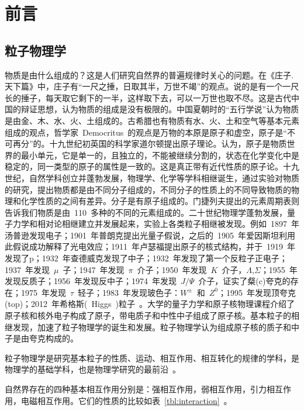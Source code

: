 \chapter{前言}

\section{粒子物理学}

物质是由什么组成的？这是人们研究自然界的普遍规律时关心的问题。在《庄子.天下篇》中，庄子有“一尺之捶，日取其半，万世不竭”的观点。说的是有一个一尺长的捶子，每天取它剩下的一半，这样取下去，可以一万世也取不尽。这是古代中国的辩证思想，认为物质的组成是没有极限的。中国夏朝时的“五行学说”认为物质是由金、木、水、火、土组成的。古希腊也有物质有水、火、土和空气等基本元素组成的观点，哲学家~Democritus~的观点是万物的本原是原子和虚空，原子是“不可再分”的。十九世纪初英国的科学家道尔顿提出原子理论。认为，原子是物质世界的最小单元，它是单一的，且独立的，不能被继续分割的，状态在化学变化中是稳定的，同一类型的原子的属性是一致的。这是真正带有近代性质的原子论。十九世纪，自然学科创立并蓬勃发展，物理学、化学等学科相继诞生，通过实验对物质的研究，提出物质都是由不同分子组成的，不同分子的性质上的不同导致物质的物理和化学性质的之间有差异。分子是有原子组成的。门捷列夫提出的元素周期表则告诉我们物质是由~110~多种的不同的元素组成的。二十世纪物理学蓬勃发展，量子力学和相对论相继建立并发展起来，实验上各类粒子相继被发现。例如~1897~年汤普逊发现电子；1901~年普朗克提出光量子假说，之后的~1905~年爱因斯坦利用此假说成功解释了光电效应；1911~年卢瑟福提出原子的核式结构，并于~1919~年发现了p；1932~年查德威克发现了中子；1932~年发现了第一个反粒子正电子；1937~年发现~$\mu$~子；1947~年发现~$\pi$~介子；1950~年发现~$K$~介子，$\Lambda$,$\Sigma$；1955~年发现反质子；1956~年发现反中子；1974~年发现~$J/\Psi$~介子，证实了粲(c)夸克的存在；1975~年发现~$\tau$~轻子；1983~年发现玻色子：$W^{\pm}$~和~$Z^{0}$；1995~年发现顶夸克(top)；2012~年希格斯(~Higgs~)粒子~\cite{ATLAS:2012}\cite{CMS:2012}。大学的量子力学和原子核物理课程介绍了原子核和核外电子构成了原子，带电质子和中性中子组成了原子核。基本粒子的相继发现，加速了粒子物理学的诞生和发展。粒子物理学认为组成原子核的质子和中子是由夸克构成的。\cite{2014lv}

粒子物理学是研究基本粒子的性质、运动、相互作用、相互转化的规律的学科，是物理学的基础学科，也是物理学研究的最前沿~\cite{zhangns2015}。

自然界存在的四种基本相互作用分别是：强相互作用，弱相互作用，引力相互作用，电磁相互作用。它们的性质的比较如表~\ref{tbl:interaction}~\cite{duds2015}。

